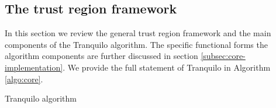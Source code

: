 
\subsection{The trust region framework}
\label{subsec:tr-framework}
In this section we review the general trust region framework and the main components of the Tranquilo algorithm. The specific functional forms the algorithm components are further discussed in section \ref{subsec:core-implementation}. We provide the full statement of Tranquilo in Algorithm \ref{algo:core}.

\begin{algorithm}[H]
    \caption{Tranquilo algorithm}\label{algo:core}
\end{algorithm}
